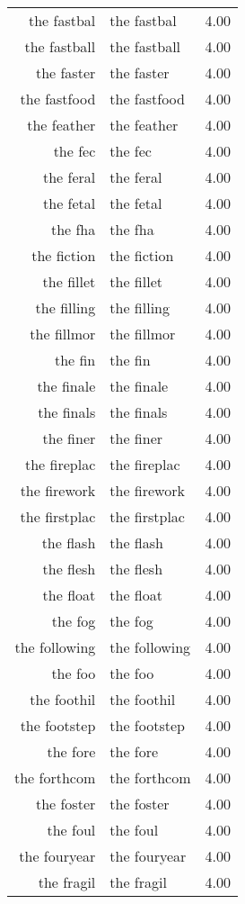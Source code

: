 \begin{table}[ht]
\begin{tabular}{rlr}
  the fastbal & the fastbal & 4.00 \\ 
  the fastball & the fastball & 4.00 \\ 
  the faster & the faster & 4.00 \\ 
  the fastfood & the fastfood & 4.00 \\ 
  the feather & the feather & 4.00 \\ 
  the fec & the fec & 4.00 \\ 
  the feral & the feral & 4.00 \\ 
  the fetal & the fetal & 4.00 \\ 
  the fha & the fha & 4.00 \\ 
  the fiction & the fiction & 4.00 \\ 
  the fillet & the fillet & 4.00 \\ 
  the filling & the filling & 4.00 \\ 
  the fillmor & the fillmor & 4.00 \\ 
  the fin & the fin & 4.00 \\ 
  the finale & the finale & 4.00 \\ 
  the finals & the finals & 4.00 \\ 
  the finer & the finer & 4.00 \\ 
  the fireplac & the fireplac & 4.00 \\ 
  the firework & the firework & 4.00 \\ 
  the firstplac & the firstplac & 4.00 \\ 
  the flash & the flash & 4.00 \\ 
  the flesh & the flesh & 4.00 \\ 
  the float & the float & 4.00 \\ 
  the fog & the fog & 4.00 \\ 
  the following & the following & 4.00 \\ 
  the foo & the foo & 4.00 \\ 
  the foothil & the foothil & 4.00 \\ 
  the footstep & the footstep & 4.00 \\ 
  the fore & the fore & 4.00 \\ 
  the forthcom & the forthcom & 4.00 \\ 
  the foster & the foster & 4.00 \\ 
  the foul & the foul & 4.00 \\ 
  the fouryear & the fouryear & 4.00 \\ 
  the fragil & the fragil & 4.00 \\ 

\end{tabular}
\end{table}
